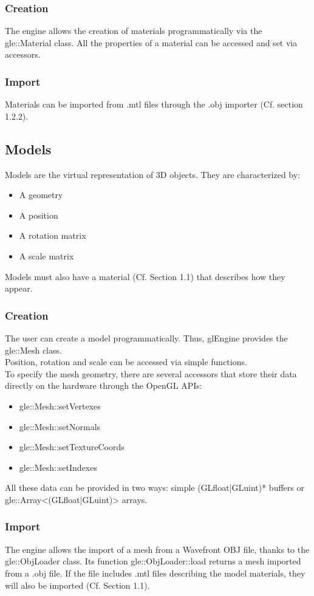 \documentclass [a4 paper,11pt]{article}
\begin{document}
\subsubsection{Creation}
The engine allows the creation of materials programmatically via the gle::Material class. All the properties of a material can be accessed and set via accessors.
\subsubsection{Import}
Materials can be imported from .mtl files through the .obj importer (Cf. section 1.2.2).

\subsection{Models}
Models are the virtual representation of 3D objects. They are characterized by:
\begin{itemize}
\item A geometry
\item A position
\item A rotation matrix
\item A scale matrix
\end{itemize}
Models must also have a material (Cf. Section 1.1) that describes how they appear.\\

\subsubsection{Creation}
The user can create a model programmatically. Thus, glEngine provides the gle::Mesh class.\\
Position, rotation and scale can be accessed via simple functions.\\
To specify the mesh geometry, there are several accessors that store their data directly on the hardware through the OpenGL APIs:
\begin{itemize}
\item gle::Mesh::setVertexes
\item gle::Mesh::setNormals
\item gle::Mesh::setTextureCoords
\item gle::Mesh::setIndexes
\end{itemize}
All these data can be provided in two ways: simple (GLfloat|GLuint)* buffers or gle::Array<(GLfloat|GLuint)> arrays.

\subsubsection{Import}
The engine allows the import of a mesh from a Wavefront OBJ file, thanks to the gle::ObjLoader class. Its function gle::ObjLoader::load returns a mesh imported from a .obj file. If the file includes .mtl files describing the model materials, they will also be imported (Cf. Section 1.1).
\end{document}
